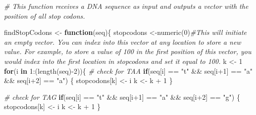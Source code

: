 \documentclass[
]{article}
\newenvironment{Shaded}{\begin{snugshade}}{\end{snugshade}}
\newcommand{\CommentTok}[1]{\textcolor[rgb]{0.56,0.35,0.01}{\textit{#1}}}
\newcommand{\ControlFlowTok}[1]{\textcolor[rgb]{0.13,0.29,0.53}{\textbf{#1}}}
\newcommand{\DecValTok}[1]{\textcolor[rgb]{0.00,0.00,0.81}{#1}}
\newcommand{\FunctionTok}[1]{\textcolor[rgb]{0.00,0.00,0.00}{#1}}
\newcommand{\NormalTok}[1]{#1}
\newcommand{\OtherTok}[1]{\textcolor[rgb]{0.56,0.35,0.01}{#1}}
\newcommand{\SpecialCharTok}[1]{\textcolor[rgb]{0.00,0.00,0.00}{#1}}
\newcommand{\StringTok}[1]{\textcolor[rgb]{0.31,0.60,0.02}{#1}}
\begin{document}
\begin{Shaded}
\begin{Highlighting}[]
\CommentTok{\# This function receives a DNA sequence as input and outputs a vector with the position of all stop codons.}

\NormalTok{findStopCodons }\OtherTok{\textless{}{-}} \ControlFlowTok{function}\NormalTok{(seq)\{}
\NormalTok{  stopcodons }\OtherTok{\textless{}{-}}\FunctionTok{numeric}\NormalTok{(}\DecValTok{0}\NormalTok{)}\CommentTok{\#This will initiate an empty vector. You can index into this vector at any location to store a new value. For example, to store a value of 100 in the first position of this vector, you would index into the first location in stopcodons and set it equal to 100.}
\NormalTok{  k }\OtherTok{\textless{}{-}} \DecValTok{1}
  \ControlFlowTok{for}\NormalTok{(i }\ControlFlowTok{in} \DecValTok{1}\SpecialCharTok{:}\NormalTok{(}\FunctionTok{length}\NormalTok{(seq)}\SpecialCharTok{{-}}\DecValTok{2}\NormalTok{))\{ }
    \CommentTok{\# check for TAA}
    \ControlFlowTok{if}\NormalTok{(seq[i] }\SpecialCharTok{==} \StringTok{"t"} \SpecialCharTok{\&\&}\NormalTok{ seq[i}\SpecialCharTok{+}\DecValTok{1}\NormalTok{] }\SpecialCharTok{==} \StringTok{"a"} \SpecialCharTok{\&\&}\NormalTok{ seq[i}\SpecialCharTok{+}\DecValTok{2}\NormalTok{] }\SpecialCharTok{==} \StringTok{"a"}\NormalTok{) \{}
\NormalTok{      stopcodons[k] }\OtherTok{\textless{}{-}}\NormalTok{ i}
\NormalTok{      k }\OtherTok{\textless{}{-}}\NormalTok{ k }\SpecialCharTok{+} \DecValTok{1}
\NormalTok{    \}}
    
    \CommentTok{\# check for TAG}
    \ControlFlowTok{if}\NormalTok{(seq[i] }\SpecialCharTok{==} \StringTok{"t"} \SpecialCharTok{\&\&}\NormalTok{ seq[i}\SpecialCharTok{+}\DecValTok{1}\NormalTok{] }\SpecialCharTok{==} \StringTok{"a"} \SpecialCharTok{\&\&}\NormalTok{ seq[i}\SpecialCharTok{+}\DecValTok{2}\NormalTok{] }\SpecialCharTok{==} \StringTok{"g"}\NormalTok{) \{}
\NormalTok{      stopcodons[k] }\OtherTok{\textless{}{-}}\NormalTok{ i}
\NormalTok{      k }\OtherTok{\textless{}{-}}\NormalTok{ k }\SpecialCharTok{+} \DecValTok{1}
\NormalTok{    \}}
    

\end{Highlighting}
\end{Shaded}
\end{document}

